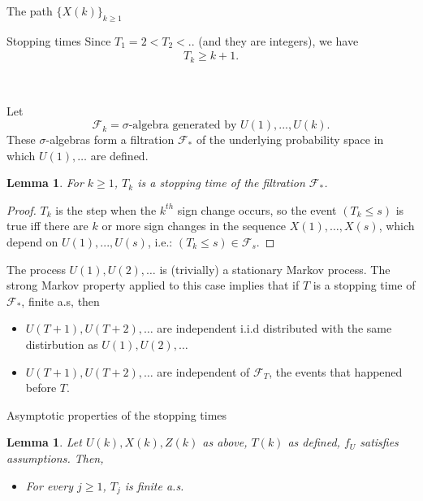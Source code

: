 \documentclass[12pt]{article}
\newtheorem{lemma}[theorem]{Lemma}
\newenvironment{remark}[1][Remark]{\begin{trivlist}
		\item[\hskip \labelsep {\bfseries #1}]}{\end{trivlist}}
\begin{document}
\begin{section}{The path $\{X(k)\}_{k\ge1}$ }
\begin{subsection}{Stopping times}
Since $T_1 =2 < T_2 <..$ (and they are integers), we have
\begin{align}
T_k \ge k+1 .
\end{align}

\   
\   
\   
\   

Let 
\begin{equation} \label{eq:filter}
\mathcal{F}_k = \sigma \text{-algebra generated by $U(1),...,U(k)$}.
\end{equation}
These $\sigma$-algebras form a filtration $\mathcal{F_*}$ of the underlying probability space in which $U(1),\dots$ are defined.

\begin{lemma}
For $k \ge 1$,  $T_k$ is a stopping time of the  filtration $\mathcal{F}_*$.
\end{lemma}

\begin{proof}
	$T_k$ is the step when the $k^{th}$ sign change occurs, so the event $(T_k \le s)$ is true iff there are $k$ or more sign changes in the sequence $X(1),\dots,X(s)$, which depend on  $U(1),...,U(s)$, i.e.: $(T_k \le s) \in \mathcal{F}_s$.
\end{proof}

	\begin{remark}[Remarks]
	The process $U(1), U(2), \dots$ is (trivially) a stationary Markov process. The strong Markov property applied to this case implies that if $T$ is a stopping time of $\mathcal{F}_*$, finite a.s, then
	
		\begin{itemize}
			\item[i.] $U(T+1), U(T+2) ,\dots$ are independent i.i.d distributed with the same distirbution as $U(1), U(2) ,\dots$
			\item[ii.] $U(T+1), U(T+2) ,\dots$ are independent of $\mathcal{F}_T$, the events that happened before $T$.
		\end{itemize}
	 
	\end{remark}
\end{subsection}


\begin{subsection}{Asymptotic properties of the stopping times}

\begin{lemma} \label{lmm:Ts} Let $U(k),X(k),Z(k)$ as above, $T(k)$ as defined, $f_U$ satisfies assumptions. Then,
\begin{itemize}
	\item[i.] For every $j \ge 1$, $T_{j}$ is finite a.s.
	

\end{itemize}
\end{lemma}
\end{subsection}
\end{section}
\end{document}
